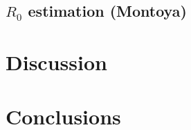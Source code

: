 \documentclass[11pt]{imammb}
\numberwithin{equation}{section}
\begin{document}
        \subsection{$R_0$ estimation (Montoya)}
            
    \section{Discussion}
        
    \section{Conclusions}
        
    {}
\end{document}
